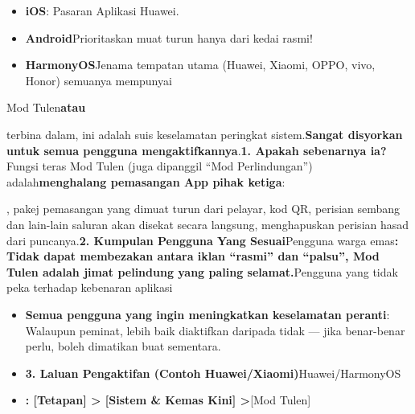 


\begin{itemize}
  \item \textbf{iOS}: Pasaran Aplikasi Huawei.
  \item \textbf{Android}Prioritaskan muat turun hanya dari kedai rasmi!
  \item \textbf{HarmonyOS}Jenama tempatan utama (Huawei, Xiaomi, OPPO, vivo, Honor) semuanya mempunyai
\end{itemize}

Mod Tulen\textbf{atau}


terbina dalam, ini adalah suis keselamatan peringkat sistem.\textbf{Sangat disyorkan untuk semua pengguna mengaktifkannya}.\textbf{1. Apakah sebenarnya ia?}Fungsi teras Mod Tulen (juga dipanggil “Mod Perlindungan”) adalah\textbf{menghalang pemasangan App pihak ketiga}:


, pakej pemasangan yang dimuat turun dari pelayar, kod QR, perisian sembang dan lain-lain saluran akan disekat secara langsung, menghapuskan perisian hasad dari puncanya.\textbf{2. Kumpulan Pengguna Yang Sesuai}Pengguna warga emas\textbf{: Tidak dapat membezakan antara iklan “rasmi” dan “palsu”, Mod Tulen adalah jimat pelindung yang paling selamat.}Pengguna yang tidak peka terhadap kebenaran aplikasi


\begin{itemize}
  \item \textbf{Semua pengguna yang ingin meningkatkan keselamatan peranti}: Walaupun peminat, lebih baik diaktifkan daripada tidak — jika benar-benar perlu, boleh dimatikan buat sementara.
  \item \textbf{3. Laluan Pengaktifan (Contoh Huawei/Xiaomi)}Huawei/HarmonyOS
  \item \textbf{: [Tetapan] > [Sistem \& Kemas Kini] >}[Mod Tulen]
\end{itemize}

